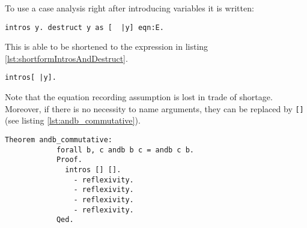 		  To use a case analysis right after introducing variables it is written:
		  \begin{lstlisting}[caption = \lstinline!intros! and \lstinline!destruct!]
		  	intros y. destruct y as [  |y] eqn:E.
		  \end{lstlisting}	
		  This is able to be shortened to the expression in listing \ref{lst:shortformIntrosAndDestruct}.  
		  \begin{lstlisting}[caption= shortform \lstinline!intros! and  \lstinline!destruct!, label= lst:shortformIntrosAndDestruct]
		  intros[ |y].
		  \end{lstlisting}		  
		  Note that the equation recording assumption is lost in trade of shortage.
		  Moreover, if there is no necessity to name arguments, they can be replaced by \lstinline![]! (see listing \ref{lst:andb_commutative}).
		  \begin{lstlisting}[caption= \lstinline!andb_commutative!, label =lst:andb_commutative]
		  Theorem andb_commutative:
		    forall b, c andb b c = andb c b.
		    Proof.
		      intros [] [].
		        - reflexivity.
		        - reflexivity.
		        - reflexivity.
		        - reflexivity.
		    Qed. 		  		  
		  \end{lstlisting}
		     
	    
   
   
   
